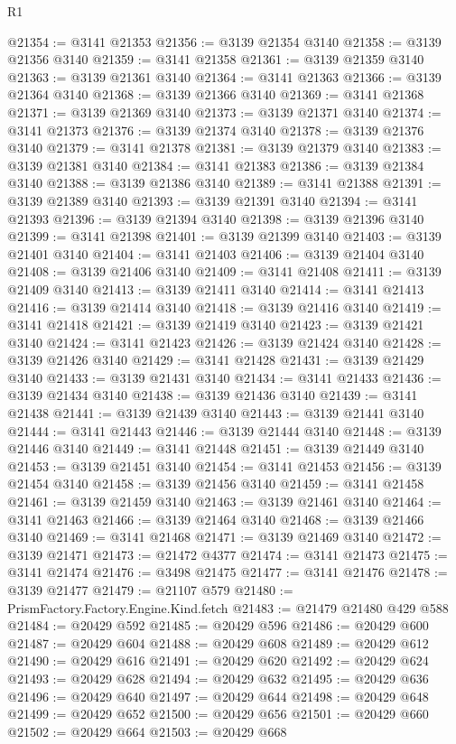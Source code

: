 \begin{lexlean}{R1}
\begin{coremodule}
@21354 := @3141 @21353
@21356 := @3139 @21354 @3140
@21358 := @3139 @21356 @3140
@21359 := @3141 @21358
@21361 := @3139 @21359 @3140
@21363 := @3139 @21361 @3140
@21364 := @3141 @21363
@21366 := @3139 @21364 @3140
@21368 := @3139 @21366 @3140
@21369 := @3141 @21368
@21371 := @3139 @21369 @3140
@21373 := @3139 @21371 @3140
@21374 := @3141 @21373
@21376 := @3139 @21374 @3140
@21378 := @3139 @21376 @3140
@21379 := @3141 @21378
@21381 := @3139 @21379 @3140
@21383 := @3139 @21381 @3140
@21384 := @3141 @21383
@21386 := @3139 @21384 @3140
@21388 := @3139 @21386 @3140
@21389 := @3141 @21388
@21391 := @3139 @21389 @3140
@21393 := @3139 @21391 @3140
@21394 := @3141 @21393
@21396 := @3139 @21394 @3140
@21398 := @3139 @21396 @3140
@21399 := @3141 @21398
@21401 := @3139 @21399 @3140
@21403 := @3139 @21401 @3140
@21404 := @3141 @21403
@21406 := @3139 @21404 @3140
@21408 := @3139 @21406 @3140
@21409 := @3141 @21408
@21411 := @3139 @21409 @3140
@21413 := @3139 @21411 @3140
@21414 := @3141 @21413
@21416 := @3139 @21414 @3140
@21418 := @3139 @21416 @3140
@21419 := @3141 @21418
@21421 := @3139 @21419 @3140
@21423 := @3139 @21421 @3140
@21424 := @3141 @21423
@21426 := @3139 @21424 @3140
@21428 := @3139 @21426 @3140
@21429 := @3141 @21428
@21431 := @3139 @21429 @3140
@21433 := @3139 @21431 @3140
@21434 := @3141 @21433
@21436 := @3139 @21434 @3140
@21438 := @3139 @21436 @3140
@21439 := @3141 @21438
@21441 := @3139 @21439 @3140
@21443 := @3139 @21441 @3140
@21444 := @3141 @21443
@21446 := @3139 @21444 @3140
@21448 := @3139 @21446 @3140
@21449 := @3141 @21448
@21451 := @3139 @21449 @3140
@21453 := @3139 @21451 @3140
@21454 := @3141 @21453
@21456 := @3139 @21454 @3140
@21458 := @3139 @21456 @3140
@21459 := @3141 @21458
@21461 := @3139 @21459 @3140
@21463 := @3139 @21461 @3140
@21464 := @3141 @21463
@21466 := @3139 @21464 @3140
@21468 := @3139 @21466 @3140
@21469 := @3141 @21468
@21471 := @3139 @21469 @3140
@21472 := @3139 @21471
@21473 := @21472 @4377
@21474 := @3141 @21473
@21475 := @3141 @21474
@21476 := @3498 @21475
@21477 := @3141 @21476
@21478 := @3139 @21477
@21479 := @21107 @579
@21480 := PrismFactory.Factory.Engine.Kind.fetch
@21483 := @21479 @21480 @429 @588
@21484 := @20429 @592
@21485 := @20429 @596
@21486 := @20429 @600
@21487 := @20429 @604
@21488 := @20429 @608
@21489 := @20429 @612
@21490 := @20429 @616
@21491 := @20429 @620
@21492 := @20429 @624
@21493 := @20429 @628
@21494 := @20429 @632
@21495 := @20429 @636
@21496 := @20429 @640
@21497 := @20429 @644
@21498 := @20429 @648
@21499 := @20429 @652
@21500 := @20429 @656
@21501 := @20429 @660
@21502 := @20429 @664
@21503 := @20429 @668

\end{coremodule}
\end{lexlean}
